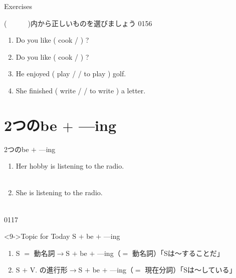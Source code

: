 \documentclass[aspectratio=169,xcolor={dvipsnames,table}]{beamer}
\begin{document}
\begin{frame}[plain]{Exercises}

{\small (~~~~~~)内から正しいものを選びましょう}%
\hfill{\tiny 0156}\,{\scriptsize {}}
 \begin{enumerate}
  \item Do you like ( cook /  ) ?
  \item Do you like ( cook /  ) ?
  \item He enjoyed ( play /  / to play ) golf.
  \item She finished ( write /  / to write ) a letter.
 \end{enumerate}
\end{frame}
\section{2つのbe $+$ ---ing}
\begin{frame}[plain,t]{2つのbe $+$ ---ing}

 \begin{enumerate}
  \item<1-> Her hobby is listening to the radio.%
\hfill{}\\
\hfill{}\\
\hfill{}
  \item<2-> She is listening to the radio.\hfill{}\\
\hfill{}\\

 \end{enumerate}
%
\hfill{\tiny 0117}\,{\scriptsize {}}

\vspace{20pt}

\begin{block}<9->{Topic for Today}\small
S $+$ be $+$ ---ing
 \begin{enumerate}[circle]
  \item<10-> S $=$ 動名詞\hspace{29pt}$\rightarrow$\hspace{5pt}S $+$ be $+$ ---ing（$=$ 動名詞）\hfill{}「Sは～することだ」
  \item<11-> S $+$ V. の進行形\hspace{10pt}$\rightarrow$\hspace{5pt}S $+$ be $+$ ---ing（$=$ 現在分詞）\hfill{}「Sは～している」
 \end{enumerate}
\end{block}
\end{frame}
\end{document}
